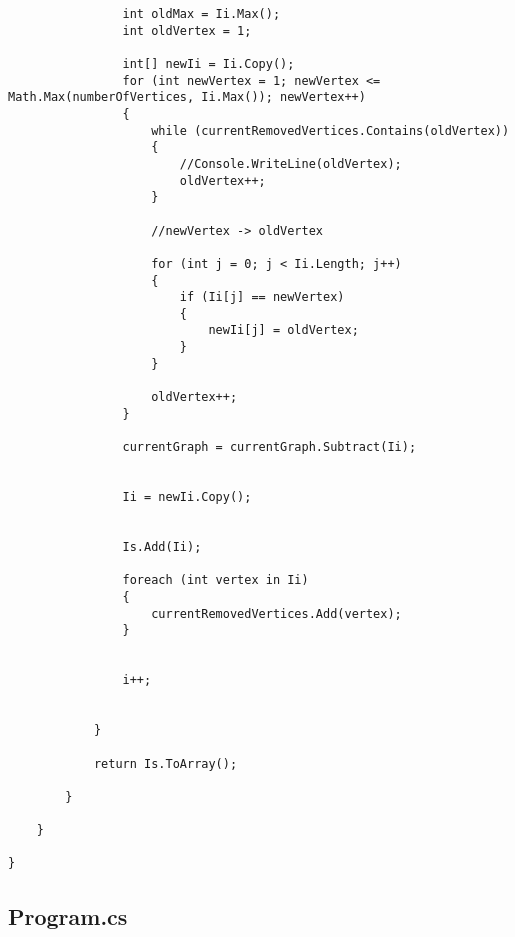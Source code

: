 \documentclass{article}
\begin{document}
\begin{lstlisting}
				int oldMax = Ii.Max();
				int oldVertex = 1;
				
				int[] newIi = Ii.Copy();
				for (int newVertex = 1; newVertex <= Math.Max(numberOfVertices, Ii.Max()); newVertex++)
				{
					while (currentRemovedVertices.Contains(oldVertex))
					{
						//Console.WriteLine(oldVertex);
						oldVertex++;
					}
					
					//newVertex -> oldVertex
					
					for (int j = 0; j < Ii.Length; j++)
					{
						if (Ii[j] == newVertex)
						{
							newIi[j] = oldVertex;
						}
					}
					
					oldVertex++;
				}
				
				currentGraph = currentGraph.Subtract(Ii);
				
				
				Ii = newIi.Copy();
				
				
				Is.Add(Ii);
				
				foreach (int vertex in Ii)
				{
					currentRemovedVertices.Add(vertex);
				}
				
				
				i++;
				
				
			}
			
			return Is.ToArray();
			
		}
		
	}
	
}

\end{lstlisting}

\subsection{Program.cs}
\end{document}
